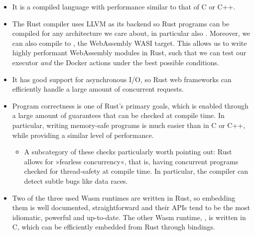 \begin{itemize}
    \item It is a compiled language with performance similar to that of C or C++.
    \item The Rust compiler uses LLVM as its backend so Rust programs can be compiled for any architecture we care about, in particular also . Moreover, we can also compile to , the WebAssembly WASI target. This allows us to write highly performant WebAssembly modules in Rust, such that we can test our executor \emph{and} the Docker actions under the best possible conditions.
    \item It has good support for asynchronous I/O, so Rust web frameworks can efficiently handle a large amount of concurrent requests.
    \item Program correctness is one of Rust's primary goals, which is enabled through a large amount of guarantees that can be checked at compile time. In particular, writing memory-safe programs is much easier than in C or C++, while providing a similar level of performance.
    \begin{itemize}
        \item A subcategory of these checks particularly worth pointing out: Rust allows for »fearless concurrency«, that is, having concurrent programs checked for thread-safety at compile time. In particular, the compiler can detect subtle bugs like data races.
    \end{itemize}
    \item Two of the three used Wasm runtimes are written in Rust, so embedding them is well documented, straightforward and their APIs tend to be the most idiomatic, powerful and up-to-date. The other Wasm runtime, , is written in C, which can be efficiently embedded from Rust through bindings.
\end{itemize}

